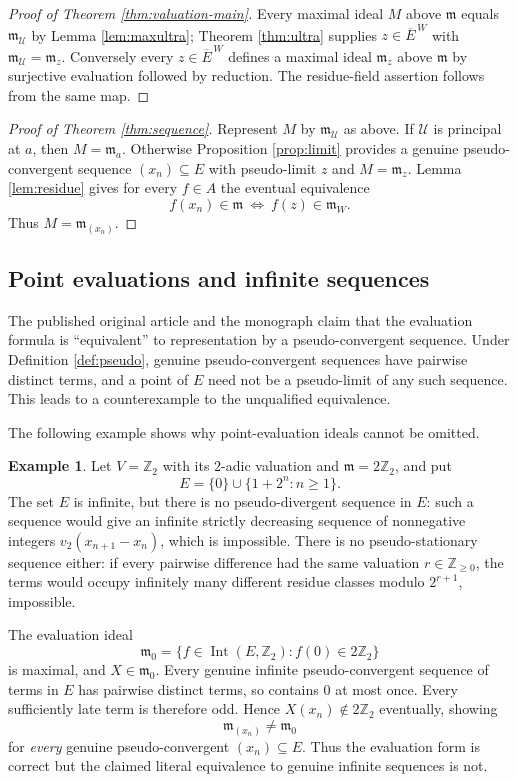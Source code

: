 \documentclass[11pt]{amsart}
\theoremstyle{definition}
\newtheorem{example}[theorem]{Example}
\theoremstyle{remark}
\newcommand{\Int}{\operatorname{Int}}
\newcommand{\m}{\mathfrak m}
\newcommand{\U}{\mathcal U}
\newcommand{\barE}{\overline E^{\,W}}
\begin{document}
\begin{proof}[Proof of Theorem \ref{thm:valuation-main}]
Every maximal ideal $M$ above $\m$ equals $\m_{\U}$ by Lemma \ref{lem:maxultra}; Theorem \ref{thm:ultra} supplies $z\in\barE$ with $\m_{\U}=\m_z$. Conversely every $z\in\barE$ defines a maximal ideal $\m_z$ above $\m$ by surjective evaluation followed by reduction. The residue-field assertion follows from the same map.
\end{proof}

\begin{proof}[Proof of Theorem \ref{thm:sequence}]
Represent $M$ by $\m_{\U}$ as above. If $\U$ is principal at $a$, then $M=\m_a$. Otherwise Proposition \ref{prop:limit} provides a genuine pseudo-convergent sequence $(x_n)\subseteq E$ with pseudo-limit $z$ and $M=\m_z$. Lemma \ref{lem:residue} gives for every $f\in A$ the eventual equivalence
\[
 f(x_n)\in\m \ \Longleftrightarrow\ f(z)\in\m_W.
\]
Thus $M=\m_{(x_n)}$.
\end{proof}

\subsection{Point evaluations and infinite sequences}\label{sec:correction}
The published original article \cite[\S3]{BoulangerChabert2020} and the monograph \cite[Conj.~VIII.39]{Chabert2025} claim that the evaluation formula is ``equivalent'' to representation by a pseudo-convergent sequence. Under Definition \ref{def:pseudo}, genuine pseudo-convergent sequences have pairwise distinct terms, and a point of $E$ need not be a pseudo-limit of any such sequence. This leads to a counterexample to the unqualified equivalence.


The following example shows why point-evaluation ideals cannot be omitted.
\begin{example}\label{ex:two}
Let $V=\mathbb Z_2$ with its $2$-adic valuation and $\m=2\mathbb Z_2$, and put
\[
 E=\{0\}\cup\{1+2^n:n\geq1\}.
\]
The set $E$ is infinite, but there is no pseudo-divergent sequence in $E$: such a sequence would give an infinite strictly decreasing sequence of nonnegative integers $v_2(x_{n+1}-x_n)$, which is impossible. There is no pseudo-stationary sequence either: if every pairwise difference had the same valuation $r\in\mathbb Z_{\geq0}$, the terms would occupy infinitely many different residue classes modulo $2^{r+1}$, impossible.

The evaluation ideal
\[
 \m_0=\{f\in\Int(E,\mathbb Z_2):f(0)\in2\mathbb Z_2\}
\]
is maximal, and $X\in\m_0$. Every genuine infinite pseudo-convergent sequence of terms in $E$ has pairwise distinct terms, so contains $0$ at most once. Every sufficiently late term is therefore odd. Hence $X(x_n)\notin2\mathbb Z_2$ eventually, showing
\[
 \m_{(x_n)}\ne\m_0
\]
for \emph{every} genuine pseudo-convergent $(x_n)\subseteq E$. Thus the evaluation form is correct but the claimed literal equivalence to genuine infinite sequences is not.
\end{example}
\end{document}
